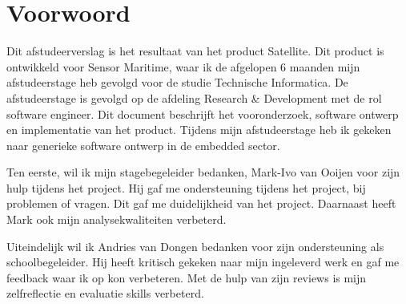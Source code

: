 \chapter*{Voorwoord}
Dit afstudeerverslag is het resultaat van het product Satellite. Dit product is ontwikkeld voor Sensor Maritime, waar ik de afgelopen 6 maanden mijn afstudeerstage heb gevolgd voor de studie Technische Informatica. De afstudeerstage is gevolgd op de afdeling Research \& Development met de rol software engineer. Dit document beschrijft het vooronderzoek, software ontwerp en implementatie van het product. Tijdens mijn afstudeerstage heb ik gekeken naar generieke software ontwerp in de embedded sector. \newline

\noindent Ten eerste, wil ik mijn stagebegeleider bedanken, Mark-Ivo van Ooijen voor zijn hulp tijdens het project. Hij gaf me ondersteuning tijdens het project, bij problemen of vragen. Dit gaf me duidelijkheid van het project. Daarnaast heeft Mark ook mijn analysekwaliteiten verbeterd. \newline

\noindent Uiteindelijk wil ik Andries van Dongen bedanken voor zijn ondersteuning als schoolbegeleider. Hij heeft kritisch gekeken naar mijn ingeleverd werk en gaf me feedback waar ik op kon verbeteren. Met de hulp van zijn reviews is mijn zelfreflectie en evaluatie skills verbeterd.
